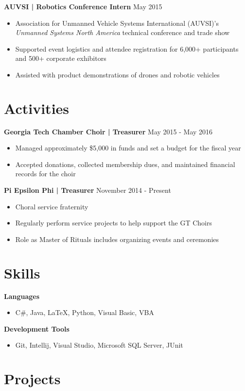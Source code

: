 \documentclass[10pt]{article}
\newcommand{\pipe}{| }
\begin{document}
\vspace{3pt}

\textbf{AUVSI \pipe Robotics Conference Intern} \hfill May 2015
\begin{itemize}
    \item Association for Unmanned Vehicle Systems International (AUVSI)'s \emph{Unmanned Systems North America} technical conference and trade show
    \item Supported event logistics and attendee registration for 6,000+ participants and 500+ corporate exhibitors
    \item Assisted with product demonstrations of drones and robotic vehicles
\end{itemize}

\section*{Activities}

\textbf{Georgia Tech Chamber Choir \pipe Treasurer} \hfill May 2015 - May 2016
\begin{itemize}
    \item Managed approximately \$5,000 in funds and set a budget for the fiscal year
    \item Accepted donations, collected membership dues, and maintained financial records for the choir
\end{itemize}

\vspace{3pt}

\textbf{Pi Epsilon Phi \pipe Treasurer} \hfill November 2014 - Present
\begin{itemize}
    \item Choral service fraternity
    \item Regularly perform service projects to help support the GT Choirs
    \item Role as Master of Rituals includes organizing events and ceremonies
\end{itemize}

\section*{Skills}
\textbf{Languages}
\begin{itemize}
    \item C\#, Java, \LaTeX, Python, Visual Basic, VBA
\end{itemize}

\vspace{3pt}

\textbf{Development Tools}
\begin{itemize}
    \item Git, Intellij, Visual Studio, Microsoft SQL Server, JUnit
\end{itemize}

\section*{Projects}
\end{document}
